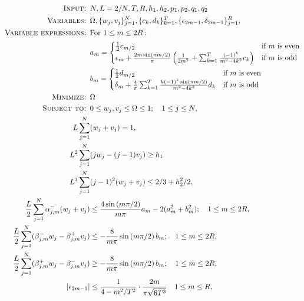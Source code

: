 \documentclass[12pt]{article}
\numberwithin{equation}{section}
\begin{document}
\begin{align}
\textsc{Input: } & N,L=2/N,T,R,h_1,h_2,p_1,p_2,q_1,q_2 \nonumber \\
\textsc{Variables: }& \Omega, \{w_j,v_j\}_{j=1}^N,\{c_k,d_k\}_{k=1}^T,\{\epsilon_{2m-1},\delta_{2m-1}\}_{j=1}^R,\nonumber \\
\textsc{Variable expressions: } &\text{For } 1 \leq m \leq 2R:\nonumber\\
& a_m = \begin{cases} \frac{1}{2}c_{m/2} & \text{if }m \text{ is even} \\ 
\epsilon_m+\frac{2m\sin(\pi m/2)}{\pi} \left( \frac{1}{2m^2}+ \sum_{k=1}^T \frac{(-1)^k }{m^2-4k^2} c_k \right) & \text{if }m \text{ is odd} \end{cases}  \nonumber \\
&b_m = \begin{cases} \frac{1}{2}d_{m/2} & \text{if }m \text{ is even} \\ 
\delta_m+ \frac{4}{\pi} \sum_{k=1}^T \frac{k(-1)^k \sin(\pi m/2)}{m^2-4k^2} d_k & \text{if }m \text{ is odd} \end{cases} \nonumber \\
\textsc{Minimize: } &\Omega  \nonumber \\
\textsc{Subject to: }  &0 \leq w_j ,v_j \leq \Omega \leq 1; \quad 1 \leq j \leq N,\label{fullbound} \\
   L\sum_{j=1}^{N} &(w_j+v_j) = 1, \label{fullmass} \\
   L^2 \sum_{j=1}^{N}  &(jw_j-(j-1)v_j) \geq h_1 \label{fullav}\\
    L^3 \sum_{j=1}^{N} & (j-1)^2 (w_j +v_j) \leq 2/3+h_2^2/2, \label{fullmom} \\
     \frac{L}{2}\sum_{j=1}^{N} \alpha_{j,m}^-(w_j+v_j) & \leq  \frac{4 \sin \left(m\pi /2 \right)}{m \pi}  a_m - 2(a_m^2+b_m^2); \quad 1 \leq m \leq 2R,\label{fullcos} \\
   \frac{L}{2}\sum_{j=1}^N (\beta_{j,m}^-w_j-\beta_{j,m}^+v_j) &\leq -\frac{8}{m \pi}\sin\left( m\pi /2 \right) b_m ; \quad 1 \leq m \leq 2R, \label{fullsinep} \\
     \frac{L}{2}\sum_{j=1}^N (\beta_{j,m}^+w_j-\beta_{j,m}^-v_j) & \geq -\frac{8}{m \pi}\sin\left( m\pi /2 \right) b_m; \quad 1 \leq m \leq 2R,\label{fullsinem}\\
 | \epsilon_{2m-1} | & \leq \frac{1}{4-m^2/T^2} \cdot \frac{2m}{\pi \sqrt{6T^3}} \quad 1 \leq m \leq R, \label{fullep}\\

\end{align}
\end{document}
